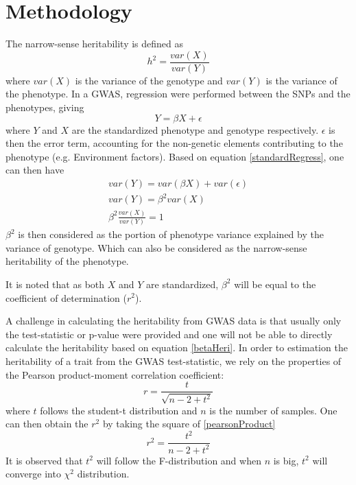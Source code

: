 \documentclass{book}
\begin{document}
	\section{Methodology}
		The narrow-sense heritability is defined as 
		$$
			h^2 = \frac{var(X)}{var(Y)}
		$$
		where $var(X)$ is the variance of the genotype and $var(Y)$ is the variance of the phenotype.
		In a \acrfull{GWAS}, regression were performed between the \acrshort{SNP}s and the phenotypes, giving
		\begin{equation}
			Y=\beta X+\epsilon
			\label{standardRegress}
		\end{equation}
		where $Y$ and $X$ are the standardized phenotype and genotype respectively. 
		$\epsilon$ is then the error term, accounting for the non-genetic elements contributing to the phenotype (e.g. Environment factors).
		Based on equation \ref{standardRegress}, one can then have
		\begin{align}
			var(Y) = var(\beta X)+ var(\epsilon) \nonumber\\
			var(Y) = \beta^2var(X) \nonumber\\
			\beta^2\frac{var(X)}{var(Y)}= 1
			\label{betaHeri}
		\end{align}
		$\beta^2$ is then considered as the portion of phenotype variance explained by the variance of genotype. 
		Which can also be considered as the narrow-sense heritability of the phenotype.
		
		It is noted that as both $X$ and $Y$ are standardized, $\beta^2$ will be equal to the coefficient of determination ($r^2$). 
		
		A challenge in calculating the heritability from \acrshort{GWAS} data is that usually only the test-statistic or p-value were provided and one will not be able to directly calculate the heritability based on equation \ref{betaHeri}. In order to estimation the heritability of a trait from the \acrshort{GWAS} test-statistic, we rely on the properties of the Pearson product-moment correlation coefficient:
		\begin{equation}
			r = \frac{t}{\sqrt{n-2+t^2}}
			\label{pearsonProduct}
		\end{equation}
		where $t$ follows the student-t distribution and $n$ is the number of samples.
		One can then obtain the $r^2$ by taking the square of \ref{pearsonProduct}
		\begin{equation}
			r^2 = \frac{t^2}{n-2+t^2}
			\label{oriRSquared}
		\end{equation}
		It is observed that $t^2$ will follow the F-distribution and when $n$ is big, $t^2$ will converge into $\chi^2$ distribution.
		
\end{document}
